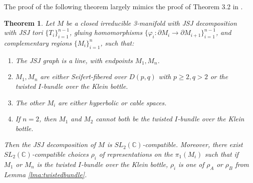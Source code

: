 \documentclass{article}
\theoremstyle{plain}
\newtheorem{theorem}{Theorem}[section]
\theoremstyle{definition}
\theoremstyle{plain}
\theoremstyle{plain}
\theoremstyle{plain}
\theoremstyle{remark}
\theoremstyle{remark}
\theoremstyle{plain}
\theoremstyle{plain}
\begin{document}
The proof of the following theorem largely mimics the proof of Theorem 3.2 in \cite{Wang}.

\begin{theorem}\label{thm:compatible}
Let $M$ be a closed irreducible 3-manifold with JSJ decomposition with JSJ tori $\{T_i\}_{i=1}^{n-1}$, gluing homomorphisms $\{\varphi_i: \partial M_i \to \partial M_{i+1}\}_{i=1}^{n-1}$, and complementary regions $\{M_i\}_{i=1}^n$, such that:
\begin{enumerate}
	\item The JSJ graph is a line, with endpoints $M_1, M_n$. 
	\item $M_1, M_n$ are either Seifert-fibered over $D(p, q)$ with $p \geq 2, q > 2$ or the twisted $I$-bundle over the Klein bottle.
	\item The other $M_i$ are either hyperbolic or cable spaces.
	\item If $n = 2$, then $M_1$ and $M_2$ cannot both be the twisted $I$-bundle over the Klein bottle.
\end{enumerate}
Then the JSJ decomposition of $M$ is $SL_2(\mathbb{C})$-compatible. Moreover, there exist $SL_2(\mathbb{C})$-compatible choices $\rho_i$ of representations on the $\pi_1(M_i)$ such that if $M_1$ or $M_n$ is the twisted $I$-bundle over the Klein bottle, $\rho_i$ is one of $\rho_A$ or $\rho_B$ from Lemma \ref{lma:twistedbundle}. 
\end{theorem}
\end{document}
